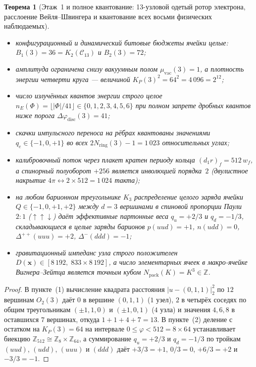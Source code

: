 \documentclass[11pt,a4paper]{article}
\theoremstyle{plain}
\newtheorem{theorem}{Теорема}[section]
\theoremstyle{definition}
\begin{document}
\begin{theorem}[Этаж~1 и полное квантование: 13-узловой одетый ротор электрона, расслоение Вейля--Швингера и квантование всех восьми физических наблюдаемых]
\begin{enumerate}[label=\textbf{(\arabic*)},leftmargin=*]
  \begin{itemize}[leftmargin=*]
  \item конфигурационный и динамический битовые бюджеты ячейки целые: $B_1(3) = 36 = K_2(\mathcal{C}_{13})$ и $B_2(3) = 72$;
  \item амплитуда ограничена снизу вакуумным полом $\mu_{\mathrm{vac}}(3) = 1$, а плотность энергии четверти круга --- величиной $K_P(3)^2 = 64^2 = 4\,096 = 2^{12}$;
  \item число излучённых квантов энергии строго целое $\hat{n}_E(\Phi) = \lfloor|\Phi|/41\rfloor \in \{0, 1, 2, 3, 4, 5, 6\}$ при полном запрете дробных квантов ниже порога $\Delta\varphi_{\mathrm{disc}}(3) = 41$;
  \item скачки импульсного переноса на рёбрах квантованы значениями $q_e \in \{-1, 0, +1\}$ во всех $2 N_{\mathrm{ring}}(3) - 1 = 1\,023$ относительных углах;
  \item калибровочный поток через плакет кратен периоду кольца $(d_1 r)_f = 512\,w_f$, а спинорный полуоборот $+256$ является инволюцией порядка~$2$ (двулистное накрытие $4\pi \leftrightarrow 2\times 512 = 1\,024$ такта);
  \item на любом барионном треугольнике $K_3$ распределение целого заряда ячейки $Q \in \{-1, 0, +1, +2\}$ между $d = 3$ вершинами в спиновой пропорции Паули $2 : 1$ ($\uparrow\uparrow\downarrow$) даёт эффективные партонные веса $q_u = +2/3$ и $q_d = -1/3$, складывающиеся в целые заряды барионов $p(uud) = +1$, $n(udd) = 0$, $\Delta^{++}(uuu) = +2$, $\Delta^-(ddd) = -1$;
  \item гравитационный импеданс узла строго положителен $D(\mathbf{x}) \in [8\,192,\; 833\times 8\,192]$, а число элементарных ячеек в макро-ячейке Вигнера--Зейтца является точным кубом $N_{\mathrm{pack}}(K) = K^3 \in \mathbb{Z}$.
  \end{itemize}
\end{enumerate}
\end{theorem}

\begin{proof}
В пункте~(1) вычисление квадрата расстояния $|u - (0,1,1)|_2^2$ по $12$ вершинам $O_2(3)$ даёт $0$ в вершине $(0,1,1)$ ($1$ узел), $2$ в четырёх соседях по общим треугольникам $(\pm 1, 1, 0)$ и $(\pm 1, 0, 1)$ ($4$ узла) и значения $4, 6, 8$ в оставшихся $7$ вершинах, откуда $1 + 1 + 4 + 7 = 13$. В пункте~(2) деление с остатком на $K_P(3) = 64$ на интервале $0 \le \varphi < 512 = 8 \times 64$ устанавливает биекцию $\mathbb{Z}_{512} \cong \mathbb{Z}_8 \times \mathbb{Z}_{64}$, а суммирование $q_u = +2/3$ и $q_d = -1/3$ по тройкам $(uud)$, $(udd)$, $(uuu)$ и $(ddd)$ даёт $+3/3 = +1$, $0/3 = 0$, $+6/3 = +2$ и $-3/3 = -1$.
\end{proof}
\end{document}
